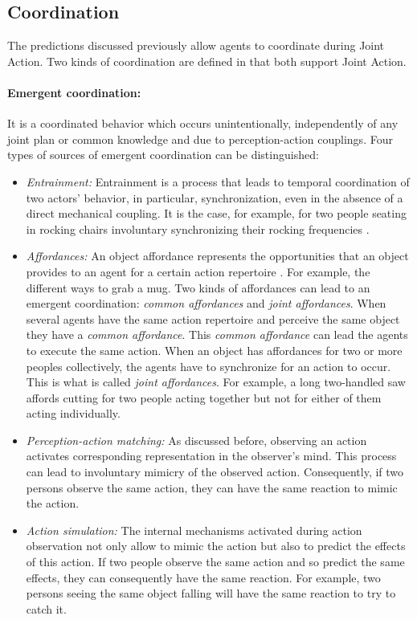 \documentclass[english,a4paper,11pt,twoside]{StyleThese}
\begin{document}
\subsection{Coordination}

\label{subsec:coordination}

The predictions discussed previously allow agents to coordinate during Joint Action. Two kinds of coordination are defined in \cite{knoblich20113} that both support Joint Action.

\paragraph{Emergent coordination:}
It is a coordinated behavior which occurs unintentionally, independently of any joint plan or common knowledge and due to perception-action couplings. Four types of sources of emergent coordination can be distinguished:
\begin{itemize}
\item \textit{Entrainment:} Entrainment is a process that leads to temporal coordination of two actors’ behavior, in particular, synchronization, even in the absence of a direct mechanical coupling. It is the case, for example, for two people seating in rocking chairs involuntary synchronizing their rocking frequencies \cite{richardson2007rocking}.
\item \textit{Affordances:} An object affordance represents the opportunities that an object provides to an agent for a certain action repertoire \cite{gibson1977perceiving}. For example, the different ways to grab a mug. Two kinds of affordances can lead to an emergent coordination: \textit{common affordances} and \textit{joint affordances}. When several agents have the same action repertoire and perceive the same object they have a \textit{common affordance}. This \textit{common affordance} can lead the agents to execute the same action. When an object has affordances for two or more peoples collectively, the agents have to synchronize for an action to occur. This is what is called \textit{joint affordances}. For example, a long two-handled saw affords cutting for two people acting together but not for either of them acting individually.
\item \textit{Perception-action matching:} As discussed before, observing an action activates corresponding representation in the observer's mind. This process can lead to involuntary mimicry of the observed action. Consequently, if two persons observe the same action, they can have the same reaction to mimic the action.
\item \textit{Action simulation:} The internal mechanisms activated during action observation not only allow to mimic the action but also to predict the effects of this action. If two people observe the same action and so predict the same effects, they can consequently have the same reaction. For example, two persons seeing the same object falling will have the same reaction to try to catch it.
\end{itemize}
\end{document}

